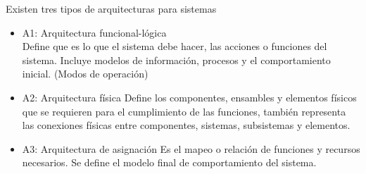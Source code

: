 \begin{enumerate}
    Existen tres tipos de arquitecturas para sistemas
    
    \begin{itemize}
        \item A1: Arquitectura funcional-lógica\\
            Define que es lo que el sistema debe hacer, las acciones o funciones del sistema. Incluye modelos de información, procesos y el comportamiento inicial. (Modos de operación)
        \item A2: Arquitectura física
            Define los componentes, ensambles y elementos físicos que se requieren para el cumplimiento de las funciones, también representa las conexiones físicas entre componentes, sistemas, subsistemas y elementos.
        \item A3: Arquitectura de asignación
            Es el mapeo o relación de funciones y recursos necesarios. Se define el modelo final de comportamiento del sistema.
    \end{itemize}
\end{enumerate}